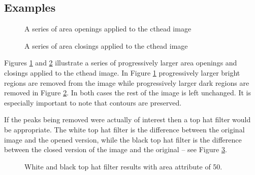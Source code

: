\documentclass{InsightArticle}
\begin{document}
\subsection{Examples}
\begin{figure}[htbp]
\begin{center}
\caption{A series of area openings applied to the cthead image\label{fig:ctheadopening}}
\end{center}
\end{figure}
\begin{figure}[htbp]
\begin{center}
\caption{A series of area closings applied to the cthead image\label{fig:ctheadclosing}}
\end{center}
\end{figure}

Figures \ref{fig:ctheadopening} and \ref{fig:ctheadclosing} illustrate
a series of progressively larger area openings and closings applied to
the cthead image. In Figure \ref{fig:ctheadopening} progressively
larger bright regions are removed from the image while progressively
larger dark regions are removed in Figure \ref{fig:ctheadclosing}. In
both cases the rest of the image is left unchanged. It is especially
important to note that contours are preserved.

If the peaks being removed were actually of interest then a top hat
filter would be appropriate. The white top hat filter is the
difference between the original image and the opened version, while
the black top hat filter is the difference between the closed version
of the image and the original -- see Figure \ref{fig:ctheadtophat}.
\begin{figure}[htbp]
\begin{center}
\caption{White and black top hat filter results with area attribute of 50.\label{fig:ctheadtophat}}
\end{center}
\end{figure}
\end{document}
